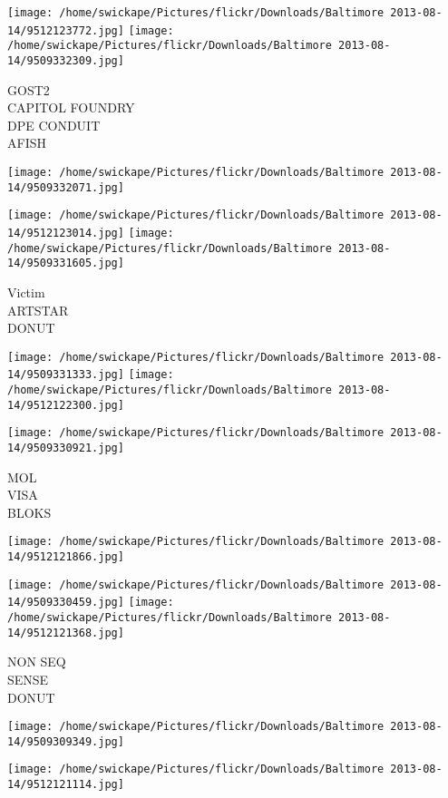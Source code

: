 \documentclass[10pt,letterpaper]{article}
\begin{document}
\texttt{[image: /home/swickape/Pictures/flickr/Downloads/Baltimore 2013-08-14/9512123772.jpg]}
\texttt{[image: /home/swickape/Pictures/flickr/Downloads/Baltimore 2013-08-14/9509332309.jpg]}

GOST2\\
CAPITOL FOUNDRY\\
DPE CONDUIT\\
AFISH
\pagebreak

\texttt{[image: /home/swickape/Pictures/flickr/Downloads/Baltimore 2013-08-14/9509332071.jpg]}

\vspace{0.25in}
\texttt{[image: /home/swickape/Pictures/flickr/Downloads/Baltimore 2013-08-14/9512123014.jpg]}
\texttt{[image: /home/swickape/Pictures/flickr/Downloads/Baltimore 2013-08-14/9509331605.jpg]}

Victim\\
ARTSTAR\\
DONUT
\pagebreak

\texttt{[image: /home/swickape/Pictures/flickr/Downloads/Baltimore 2013-08-14/9509331333.jpg]}
\texttt{[image: /home/swickape/Pictures/flickr/Downloads/Baltimore 2013-08-14/9512122300.jpg]}

\texttt{[image: /home/swickape/Pictures/flickr/Downloads/Baltimore 2013-08-14/9509330921.jpg]}

MOL\\
VISA\\
BLOKS
\pagebreak

\texttt{[image: /home/swickape/Pictures/flickr/Downloads/Baltimore 2013-08-14/9512121866.jpg]}

\vspace{0.25in}
\texttt{[image: /home/swickape/Pictures/flickr/Downloads/Baltimore 2013-08-14/9509330459.jpg]}
\texttt{[image: /home/swickape/Pictures/flickr/Downloads/Baltimore 2013-08-14/9512121368.jpg]}

NON SEQ\\
SENSE\\
DONUT
\pagebreak

\texttt{[image: /home/swickape/Pictures/flickr/Downloads/Baltimore 2013-08-14/9509309349.jpg]}

\vspace{0.25in}
\texttt{[image: /home/swickape/Pictures/flickr/Downloads/Baltimore 2013-08-14/9512121114.jpg]}
\end{document}
